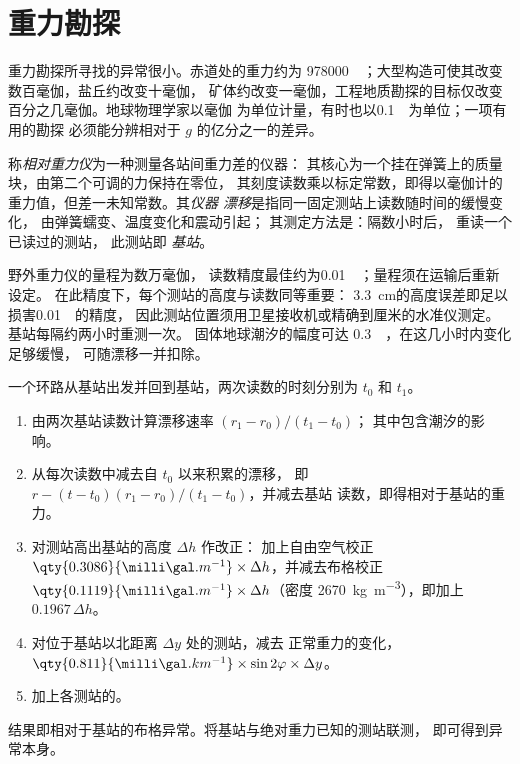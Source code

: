 \section{重力勘探}\label{sec:b3:field-lab-methods-3:gravity}

重力勘探所寻找的异常很小。赤道处的重力约为
\qty{978000}{\milli\gal}；大型构造可使其改变数百毫伽，盐丘约改变十毫伽，
矿体约改变一毫伽，工程地质勘探的目标仅改变
百分之几毫伽。地球物理学家以毫伽
为单位计量，有时也以\qty{0.1}{\milli\gal}为单位；一项有用的勘探
必须能分辨相对于
$g$ 的亿分之一的差异。

\begin{definition}\label{def:b3:field-lab-methods-3:gravimeter}
称\emph{相对重力仪}为一种测量各站间重力差的仪器：
其核心为一个挂在弹簧上的质量块，由第二个可调的力保持在零位，
其刻度读数乘以标定常数，即得以毫伽计的重力值，但差一未知常数。其\emph{仪器
漂移}是指同一固定测站上读数随时间的缓慢变化，
由弹簧蠕变、温度变化和震动引起；
其测定方法是：隔数小时后，
重读一个已读过的测站，
此测站即
\emph{基站}。
\end{definition}

野外重力仪的量程为数万毫伽，
读数精度最佳约为\qty{0.01}{\milli\gal}；量程须在运输后重新设定。
在此精度下，每个测站的高度与读数同等重要：
\qty{3.3}{cm}的高度误差即足以损害\qty{0.01}{\milli\gal}的精度，
因此测站位置须用卫星接收机或精确到厘米的水准仪测定。
基站每隔约两小时重测一次。
固体地球潮汐的幅度可达
\qty{0.3}{\milli\gal}，在这几小时内变化足够缓慢，
可随漂移一并扣除。

\begin{method}[重力环路的化算]\label{met:b3:field-lab-methods-3:loop}
一个环路从基站出发并回到基站，两次读数的时刻分别为 $t_0$ 和 $t_1$。
\begin{enumerate}
  \item 由两次基站读数计算漂移速率 $(r_1 - r_0)/(t_1 - t_0)$；
        其中包含潮汐的影响。
  \item 从每次读数中减去自 $t_0$ 以来积累的漂移，
        即 $r - (t - t_0)(r_1 - r_0)/(t_1 - t_0)$，并减去基站
        读数，即得相对于基站的重力。
  \item 对测站高出基站的高度 $\Delta h$ 作改正：
        加上自由空气校正 $\qty{0.3086}{\milli\gal.m^{-1}}
        \times\Delta h$，并减去布格校正
        $\qty{0.1119}{\milli\gal.m^{-1}}\times\Delta h$（密度
        \qty{2670}{kg.m^{-3}}），即加上 $0.1967\,\Delta h$。
  \item 对位于基站以北距离 $\Delta y$ 处的测站，减去
        正常重力的变化，$\qty{0.811}{\milli\gal.km^{-1}}
        \times\sin 2\varphi\times\Delta y$。
  \item 加上各测站的。
\end{enumerate}
结果即相对于基站的布格异常。将基站与绝对重力已知的测站联测，
即可得到异常本身。
\end{method}

